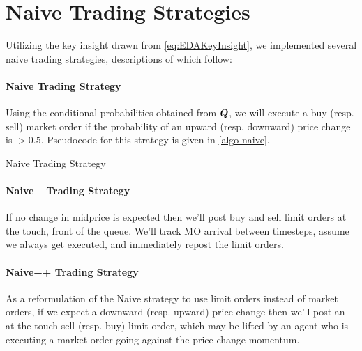 \section{Naive Trading Strategies}
Utilizing the key insight drawn from \eqref{eq:EDAKeyInsight}, we implemented several naive trading strategies, descriptions of which follow:

\paragraph{Naive Trading Strategy}  Using the conditional probabilities obtained from $\boldsymbol{Q}$, we will execute a buy (resp. sell) market order if the probability of an upward (resp. downward) price change is $> 0.5$. Pseudocode for this strategy is given in \autoref{algo-naive}.
\begin{algorithm}
\caption{Naive Trading Strategy}

\label{algo-naive}
\end{algorithm}

\paragraph{Naive+ Trading Strategy} If no change in midprice is expected then we'll post buy and sell limit orders at the touch, front of the queue. We'll track MO arrival between timesteps, assume we always get executed, and immediately repost the limit orders.
%

\paragraph{Naive++ Trading Strategy} As a reformulation of the Naive strategy to use limit orders instead of market orders, if we expect a downward (resp. upward) price change then we'll post an at-the-touch sell (resp. buy) limit order, which may be lifted by an agent who is executing a market order going against the price change momentum. 
%

